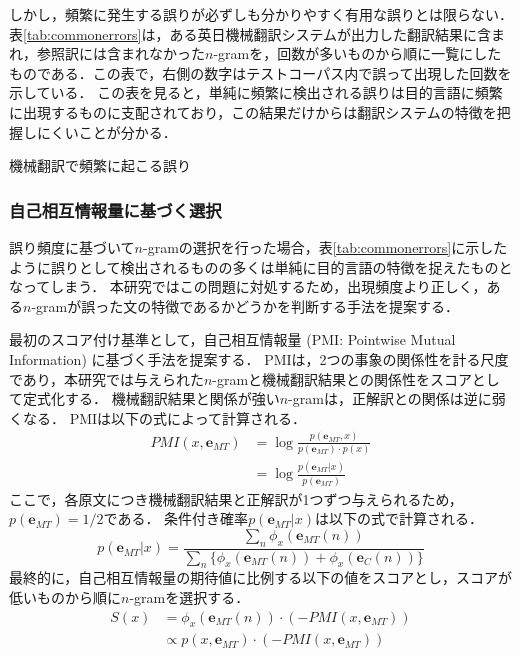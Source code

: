 \documentclass[japanese]{jnlp_1.4}
\begin{document}
しかし，頻繁に発生する誤りが必ずしも分かりやすく有用な誤りとは限らない．
表\ref{tab:commonerrors}は，ある英日機械翻訳システムが出力した翻訳結果に含まれ，参照訳には含まれなかった$n$-gramを，回数が多いものから順に一覧にしたものである．この表で，右側の数字はテストコーパス内で誤って出現した回数を示している．
この表を見ると，単純に頻繁に検出される誤りは目的言語に頻繁に出現するものに支配されており，この結果だけからは翻訳システムの特徴を把握しにくいことが分かる．

\begin{table}[t]
\caption{機械翻訳で頻繁に起こる誤り}
\label{tab:commonerrors}

\end{table}


\subsubsection{自己相互情報量に基づく選択}

誤り頻度に基づいて$n$-gramの選択を行った場合，表\ref{tab:commonerrors}に示したように誤りとして検出されるものの多くは単純に目的言語の特徴を捉えたものとなってしまう．
本研究ではこの問題に対処するため，出現頻度より正しく，ある$n$-gramが誤った文の特徴であるかどうかを判断する手法を提案する．

最初のスコア付け基準として，自己相互情報量 (PMI: Pointwise Mutual Information) に基づく手法を提案する．
PMIは，2つの事象の関係性を計る尺度であり，本研究では与えられた$n$-gramと機械翻訳結果との関係性をスコアとして定式化する．
機械翻訳結果と関係が強い$n$-gramは，正解訳との関係は逆に弱くなる．
PMIは以下の式によって計算される\cite{churchhanks90pmi}．
\begin{align*}
PMI(x, \boldsymbol{e}_{MT}) &= \log \frac{p(\boldsymbol{e}_{MT}, x)}{p(\boldsymbol{e}_{MT}) \cdot p(x)} \\
                            &= \log \frac{p(\boldsymbol{e}_{MT} | x)}{p(\boldsymbol{e}_{MT})}
\end{align*}
ここで，各原文につき機械翻訳結果と正解訳が1つずつ与えられるため，$p(\boldsymbol{e}_{MT}) = 1/2$である．
条件付き確率$p(\boldsymbol{e}_{MT} | x)$は以下の式で計算される．
\[
p(\boldsymbol{e}_{MT} | x) = \frac{\sum_n \phi_x(\boldsymbol{e}_{MT}(n))}{ \sum_n \{ \phi_x(\boldsymbol{e}_{MT}(n)) + \phi_x(\boldsymbol{e}_{C}(n)) \} }
\]
最終的に，自己相互情報量の期待値に比例する以下の値をスコアとし，スコアが低いものから順に$n$-gramを選択する．
\begin{align}
S(x) &= \phi_x(\boldsymbol{e}_{MT}(n)) \cdot (-PMI(x, \boldsymbol{e}_{MT})) \\
     & \propto  p(x, \boldsymbol{e}_{MT}) \cdot (-PMI(x, \boldsymbol{e}_{MT})) \nonumber
\end{align}
\end{document}
